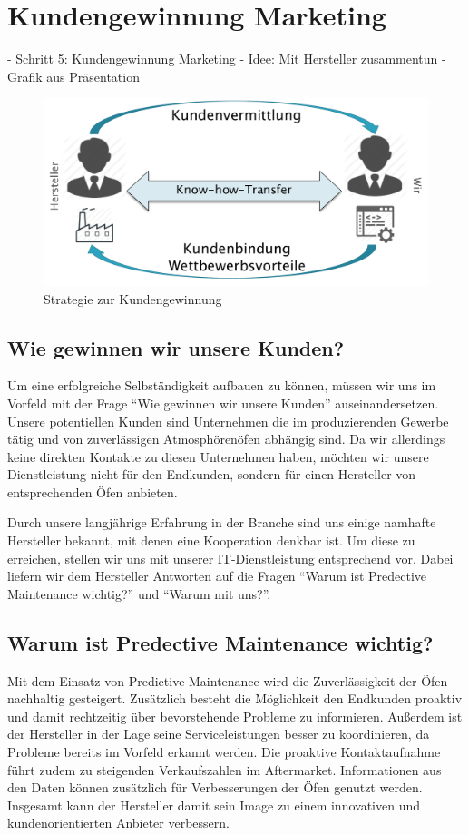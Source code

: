 \section{Kundengewinnung Marketing}

- Schritt 5: Kundengewinnung Marketing
	- Idee: Mit Hersteller zusammentun
	- Grafik aus Präsentation
	
\begin{figure}[H]
\centering
\includegraphics[width=0.7\linewidth]{Bilder/Kundengewinnung}
\caption{Strategie zur Kundengewinnung}
\label{fig:Kundengewinnung}
\end{figure}
	
	
\subsection{Wie gewinnen wir unsere Kunden?}

Um eine erfolgreiche Selbständigkeit aufbauen zu können, müssen wir uns im Vorfeld mit der Frage “Wie gewinnen wir unsere Kunden” auseinandersetzen.
Unsere potentiellen Kunden sind Unternehmen die im produzierenden Gewerbe tätig und von zuverlässigen Atmosphörenöfen abhängig sind. Da wir allerdings keine direkten Kontakte zu diesen Unternehmen haben, möchten wir unsere Dienstleistung nicht für den Endkunden, sondern für einen Hersteller von entsprechenden Öfen anbieten.

Durch unsere langjährige Erfahrung in der Branche sind uns einige namhafte Hersteller bekannt, mit denen eine Kooperation denkbar ist. Um diese zu erreichen, stellen wir uns mit unserer IT-Dienstleistung entsprechend vor. Dabei liefern wir dem Hersteller Antworten auf die Fragen “Warum ist Predective Maintenance wichtig?” und “Warum mit uns?”.

\subsection{Warum ist Predective Maintenance wichtig?}
Mit dem Einsatz von Predictive Maintenance wird die Zuverlässigkeit der Öfen nachhaltig gesteigert. Zusätzlich besteht die Möglichkeit den Endkunden proaktiv und damit rechtzeitig über bevorstehende Probleme zu informieren. Außerdem ist der Hersteller in der Lage seine Serviceleistungen besser zu koordinieren, da Probleme bereits im Vorfeld erkannt werden. Die proaktive Kontaktaufnahme führt zudem zu steigenden Verkaufszahlen im Aftermarket.  Informationen aus den Daten können zusätzlich für Verbesserungen der Öfen genutzt werden.
Insgesamt kann der Hersteller damit sein Image zu einem innovativen und kundenorientierten Anbieter verbessern.

